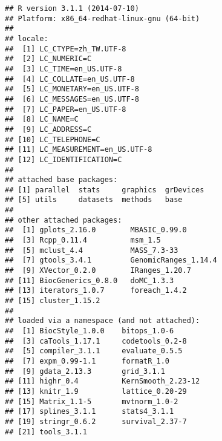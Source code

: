 \documentclass[a4paper,10pt]{article}\usepackage[]{graphicx}\usepackage[]{color}
\makeatletter
\newenvironment{kframe}{%
 \def\at@end@of@kframe{}%
 \ifinner\ifhmode%
  \def\at@end@of@kframe{\end{minipage}}%
  \begin{minipage}{\columnwidth}%
 \fi\fi%
 \def\FrameCommand##1{\hskip\@totalleftmargin \hskip-\fboxsep
 \colorbox{shadecolor}{##1}\hskip-\fboxsep
     \hskip-\linewidth \hskip-\@totalleftmargin \hskip\columnwidth}%
 \MakeFramed {\advance\hsize-\width
   \@totalleftmargin\z@ \linewidth\hsize
   \@setminipage}}%
 {\par\unskip\endMakeFramed%
 \at@end@of@kframe}
\newenvironment{knitrout}{}{} %
\makeatother
\begin{document}
\begin{knitrout}
\color{fgcolor}\begin{kframe}
\begin{verbatim}
## R version 3.1.1 (2014-07-10)
## Platform: x86_64-redhat-linux-gnu (64-bit)
## 
## locale:
##  [1] LC_CTYPE=zh_TW.UTF-8      
##  [2] LC_NUMERIC=C              
##  [3] LC_TIME=en_US.UTF-8       
##  [4] LC_COLLATE=en_US.UTF-8    
##  [5] LC_MONETARY=en_US.UTF-8   
##  [6] LC_MESSAGES=en_US.UTF-8   
##  [7] LC_PAPER=en_US.UTF-8      
##  [8] LC_NAME=C                 
##  [9] LC_ADDRESS=C              
## [10] LC_TELEPHONE=C            
## [11] LC_MEASUREMENT=en_US.UTF-8
## [12] LC_IDENTIFICATION=C       
## 
## attached base packages:
## [1] parallel  stats     graphics  grDevices
## [5] utils     datasets  methods   base     
## 
## other attached packages:
##  [1] gplots_2.16.0        MBASIC_0.99.0       
##  [3] Rcpp_0.11.4          msm_1.5             
##  [5] mclust_4.4           MASS_7.3-33         
##  [7] gtools_3.4.1         GenomicRanges_1.14.4
##  [9] XVector_0.2.0        IRanges_1.20.7      
## [11] BiocGenerics_0.8.0   doMC_1.3.3          
## [13] iterators_1.0.7      foreach_1.4.2       
## [15] cluster_1.15.2      
## 
## loaded via a namespace (and not attached):
##  [1] BiocStyle_1.0.0    bitops_1.0-6      
##  [3] caTools_1.17.1     codetools_0.2-8   
##  [5] compiler_3.1.1     evaluate_0.5.5    
##  [7] expm_0.99-1.1      formatR_1.0       
##  [9] gdata_2.13.3       grid_3.1.1        
## [11] highr_0.4          KernSmooth_2.23-12
## [13] knitr_1.9          lattice_0.20-29   
## [15] Matrix_1.1-5       mvtnorm_1.0-2     
## [17] splines_3.1.1      stats4_3.1.1      
## [19] stringr_0.6.2      survival_2.37-7   
## [21] tools_3.1.1
\end{verbatim}
\end{kframe}
\end{knitrout}






\end{document}

